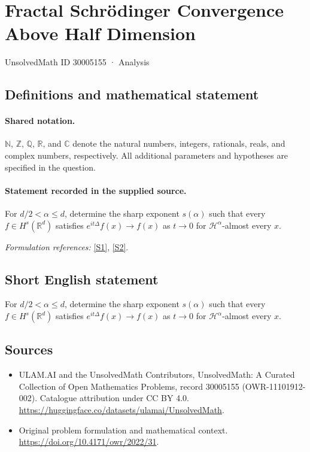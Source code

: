 \documentclass[11pt]{article}
\newcommand{\sref}[2]{\hyperlink{source:#1:#2}{[S#2]}}
\begin{document}
\setcounter{section}{30005154}
\section{Fractal Schrödinger Convergence Above Half Dimension}\label{30005155}
{\small UnsolvedMath ID 30005155 · Analysis}
\subsection{Definitions and mathematical statement}

\paragraph{Shared notation.}$\mathbb N$, $\mathbb Z$, $\mathbb Q$, $\mathbb R$, and $\mathbb C$ denote the natural numbers, integers, rationals, reals, and complex numbers, respectively. All additional parameters and hypotheses are specified in the question.


\paragraph{Statement recorded in the supplied source.}
For $d/2<\alpha\leq d$, determine the sharp exponent $s(\alpha)$ such that every $f\in H^s(\mathbb R^d)$ satisfies $e^{it\Delta}f(x)\to f(x)$ as $t\to0$ for $\mathcal H^\alpha$-almost every $x$.
\par\smallskip\textit{Formulation references:} \sref{30005155}{1}, \sref{30005155}{2}.
\subsection{Short English statement}
For $d/2<\alpha\leq d$, determine the sharp exponent $s(\alpha)$ such that every $f\in H^s(\mathbb R^d)$ satisfies $e^{it\Delta}f(x)\to f(x)$ as $t\to0$ for $\mathcal H^\alpha$-almost every $x$.
\subsection{Sources}
\begin{itemize}
\item[\hypertarget{source:30005155:1}{S1}] ULAM.AI and the UnsolvedMath Contributors, UnsolvedMath: A Curated Collection of Open Mathematics Problems, record 30005155 (OWR-11101912-002). Catalogue attribution under CC BY 4.0.
\url{https://huggingface.co/datasets/ulamai/UnsolvedMath}.
\item[\hypertarget{source:30005155:2}{S2}] Original problem formulation and mathematical context.
\url{https://doi.org/10.4171/owr/2022/31}.
\end{itemize}
\label{end:30005155}
\end{document}
